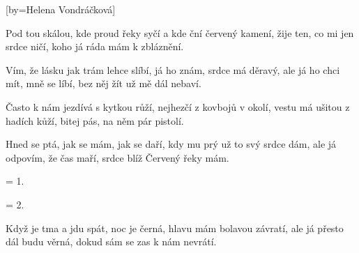 [by={Helena Vondráčková}]

\beginverse{}
Pod tou skálou, kde proud řeky syčí
a kde ční červený kamení, 
žije ten, co mi jen srdce ničí, 
koho já ráda mám k zbláznění.
\endverse{}

\beginverse{}
Vím, že lásku jak trám lehce slíbí,
já ho znám, srdce má děravý,
ale já ho chci mít, mně se líbí, 
bez něj žít už mě dál nebaví.
\endverse{}

\beginverse{}
Často k nám jezdívá s kytkou růží,
nejhezčí z kovbojů v okolí, 
vestu má ušitou z hadích kůží, 
bitej pás, na něm pár pistolí.
\endverse{}

\beginverse{}
Hned se ptá, jak se mám, jak se daří,
kdy mu prý už to svý srdce dám, 
ale já odpovím, že čas maří, 
srdce blíž Červený řeky mám.
\endverse{}

\beginverse{}
= 1.
\endverse{}

\beginverse{}
= 2.
\endverse{}

\beginverse{}
Když je tma a jdu spát, noc je černá,
hlavu mám bolavou závratí, 
ale já přesto dál budu věrná, 
dokud sám se zas k nám nevrátí.
\endverse{}

\endsong{}
